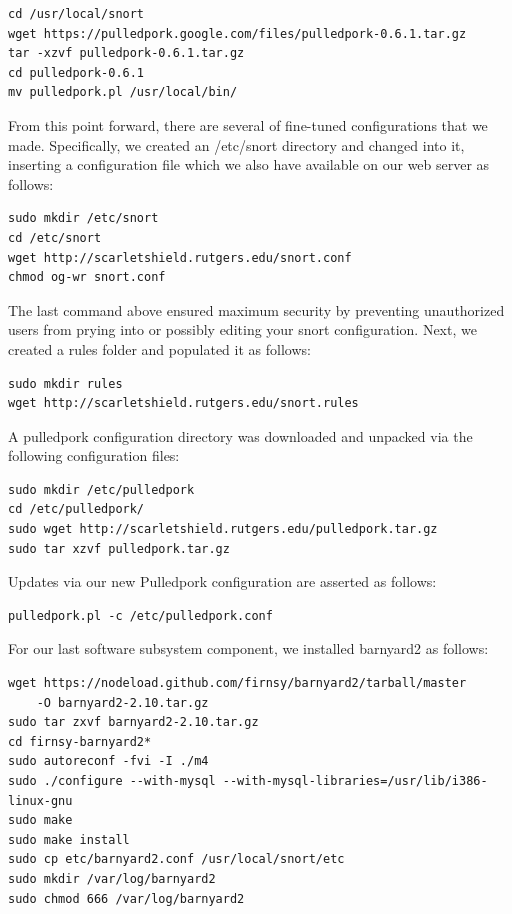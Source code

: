 \documentclass[12pt,letterpaper,titlepage]{report}
\begin{document}
{\begin{verbatim}
cd /usr/local/snort 
wget https://pulledpork.google.com/files/pulledpork-0.6.1.tar.gz 
tar -xzvf pulledpork-0.6.1.tar.gz 
cd pulledpork-0.6.1 
mv pulledpork.pl /usr/local/bin/
\end{verbatim}
From this point forward, there are several of fine-tuned configurations that we
made. Specifically, we created an /etc/snort directory and changed into it,
inserting a configuration file which we also have available on our web server as
follows: 
\begin{verbatim}
sudo mkdir /etc/snort 
cd /etc/snort 
wget http://scarletshield.rutgers.edu/snort.conf     
chmod og-wr snort.conf 
\end{verbatim}
The last
command above ensured maximum security by preventing unauthorized users from
prying into or possibly editing your snort configuration.  Next, we created a
rules folder and populated it as follows:     
\begin{verbatim}
sudo mkdir rules     
wget http://scarletshield.rutgers.edu/snort.rules 
\end{verbatim}
A pulledpork configuration
directory was downloaded and unpacked via the following configuration files:
\begin{verbatim}
sudo mkdir /etc/pulledpork     
cd /etc/pulledpork/ 
sudo wget http://scarletshield.rutgers.edu/pulledpork.tar.gz 
sudo tar xzvf pulledpork.tar.gz 
\end{verbatim}
Updates via our new Pulledpork configuration are asserted as
follows: 
\begin{verbatim}
pulledpork.pl -c /etc/pulledpork.conf	
\end{verbatim}
For our last software subsystem component, we installed barnyard2 as follows:
\begin{verbatim}
wget https://nodeload.github.com/firnsy/barnyard2/tarball/master 
    -O barnyard2-2.10.tar.gz 
sudo tar zxvf barnyard2-2.10.tar.gz 
cd firnsy-barnyard2* 
sudo autoreconf -fvi -I ./m4 
sudo ./configure --with-mysql --with-mysql-libraries=/usr/lib/i386-linux-gnu 
sudo make 
sudo make install 
sudo cp etc/barnyard2.conf /usr/local/snort/etc 
sudo mkdir /var/log/barnyard2 
sudo chmod 666 /var/log/barnyard2 

\end{verbatim}}
\end{document}
